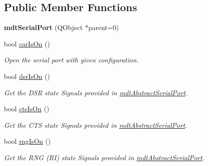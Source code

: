 \subsection*{Public Member Functions}
\begin{DoxyCompactItemize}
\item 
\hypertarget{classmdt_serial_port_a7b2da083885e727981c1fd4414634cae}{
{\bfseries mdtSerialPort} (QObject $\ast$parent=0)}
\label{classmdt_serial_port_a7b2da083885e727981c1fd4414634cae}

\item 
bool \hyperlink{classmdt_serial_port_a3eb4d41f925e40b08365ad270ee3662e}{carIsOn} ()
\begin{DoxyCompactList}\small\item\em Open the serial port with given configuration. \end{DoxyCompactList}\item 
\hypertarget{classmdt_serial_port_a8e5c0750746ac4639af4e3e51d2d52e3}{
bool \hyperlink{classmdt_serial_port_a8e5c0750746ac4639af4e3e51d2d52e3}{dsrIsOn} ()}
\label{classmdt_serial_port_a8e5c0750746ac4639af4e3e51d2d52e3}

\begin{DoxyCompactList}\small\item\em Get the DSR state  Signals provided in \hyperlink{classmdt_abstract_serial_port}{mdtAbstractSerialPort}. \end{DoxyCompactList}\item 
\hypertarget{classmdt_serial_port_a0abb533edb3d8487a7ec03f8c2fb4eb2}{
bool \hyperlink{classmdt_serial_port_a0abb533edb3d8487a7ec03f8c2fb4eb2}{ctsIsOn} ()}
\label{classmdt_serial_port_a0abb533edb3d8487a7ec03f8c2fb4eb2}

\begin{DoxyCompactList}\small\item\em Get the CTS state  Signals provided in \hyperlink{classmdt_abstract_serial_port}{mdtAbstractSerialPort}. \end{DoxyCompactList}\item 
\hypertarget{classmdt_serial_port_a92c24c78e80a297af38a8fa48f6686a8}{
bool \hyperlink{classmdt_serial_port_a92c24c78e80a297af38a8fa48f6686a8}{rngIsOn} ()}
\label{classmdt_serial_port_a92c24c78e80a297af38a8fa48f6686a8}

\begin{DoxyCompactList}\small\item\em Get the RNG (RI) state  Signals provided in \hyperlink{classmdt_abstract_serial_port}{mdtAbstractSerialPort}. \end{DoxyCompactList}\end{DoxyCompactItemize}


